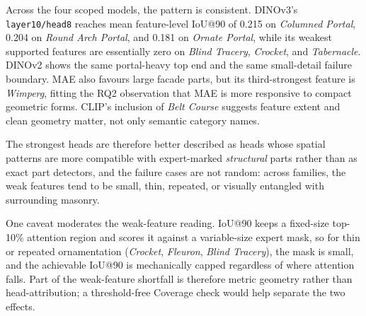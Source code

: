 \documentclass[lineno,pdflatex,sn-mathphys-num]{sn-jnl}%
\theoremstyle{thmstyleone}%
\theoremstyle{thmstyletwo}%
\theoremstyle{thmstylethree}%
\begin{document}
Across the four scoped models, the pattern is consistent. DINOv3's \texttt{layer10/head8} reaches mean feature-level IoU@90 of 0.215 on \emph{Columned Portal}, 0.204 on \emph{Round Arch Portal}, and 0.181 on \emph{Ornate Portal}, while its weakest supported features are essentially zero on \emph{Blind Tracery}, \emph{Crocket}, and \emph{Tabernacle}. DINOv2 shows the same portal-heavy top end and the same small-detail failure boundary. MAE also favours large facade parts, but its third-strongest feature is \emph{Wimperg}, fitting the RQ2 observation that MAE is more responsive to compact geometric forms. CLIP's inclusion of \emph{Belt Course} suggests feature extent and clean geometry matter, not only semantic category names.

The strongest heads are therefore better described as heads whose spatial patterns are more compatible with expert-marked \emph{structural} parts rather than as exact part detectors, and the failure cases are not random: across families, the weak features tend to be small, thin, repeated, or visually entangled with surrounding masonry.

One caveat moderates the weak-feature reading. IoU@90 keeps a fixed-size top-10\% attention region and scores it against a variable-size expert mask, so for thin or repeated ornamentation (\emph{Crocket}, \emph{Fleuron}, \emph{Blind Tracery}), the mask is small, and the achievable IoU@90 is mechanically capped regardless of where attention falls. Part of the weak-feature shortfall is therefore metric geometry rather than head-attribution; a threshold-free Coverage check would help separate the two effects.


\end{document}
